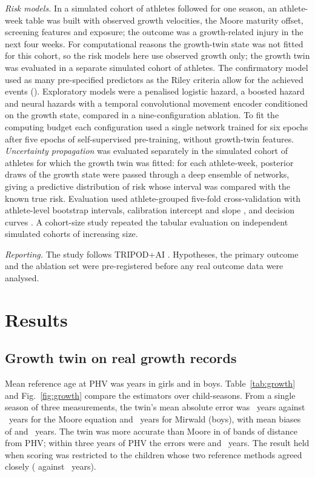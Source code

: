 \documentclass[journal]{IEEEtran}
\begin{document}
\emph{Risk models.} In a simulated cohort of \SimAthletes{} athletes followed for one season,
an athlete-week table was built with observed growth velocities, the Moore maturity offset,
screening features and exposure; the outcome was a growth-related injury in the next four
weeks. For computational reasons the growth-twin state was not fitted for this cohort, so the
risk models here use observed growth only; the growth twin was evaluated in a separate
simulated cohort of \SimGrowthN{} athletes. The confirmatory model used as many pre-specified predictors as the Riley criteria
\cite{riley2020} allow for the achieved events (\SimConfPredictors). Exploratory models were a
penalised logistic hazard, a boosted hazard and neural hazards with a temporal convolutional
movement encoder conditioned on the growth state, compared in a nine-configuration ablation.
To fit the computing budget each configuration used a single network trained for six epochs
after five epochs of self-supervised pre-training, without growth-twin features.
\emph{Uncertainty propagation} was evaluated separately in the simulated cohort of
\SimGrowthN{} athletes for which the growth twin was fitted: for each athlete-week,
\PropDraws{} posterior draws of the growth state were passed through a deep ensemble
\cite{lakshminarayanan2017} of \PropEnsemble{} networks, giving a predictive distribution of
risk whose \SpecInterval{} interval was compared with the known true risk. Evaluation used athlete-grouped five-fold
cross-validation with athlete-level bootstrap intervals, calibration intercept and slope
\cite{vancalster2019}, and decision curves \cite{vickers2006dca}. A cohort-size study repeated
the tabular evaluation on independent simulated cohorts of increasing size.

\emph{Reporting.} The study follows TRIPOD+AI \cite{collins2024tripodai}. Hypotheses, the
primary outcome and the ablation set were pre-registered before any real outcome data were
analysed.

\section{Results}

\subsection{Growth twin on real growth records}
Mean reference age at PHV was \BerkGirlsAPHV{} years in girls and \BerkBoysAPHV{} in boys.
Table~\ref{tab:growth} and Fig.~\ref{fig:growth} compare the estimators over \BerkWindows{}
child-seasons. From a single season of three measurements, the twin's mean absolute error was
\BerkTwinMAE{}~years against \BerkMooreMAE{}~years for the Moore equation and
\BerkMirwaldMAE{}~years for Mirwald (boys), with mean biases of \BerkTwinBias{} and
\BerkMooreBias{}~years. The twin was more accurate than Moore in \BerkBandsBetter{} of
\BerkBands{} bands of distance from PHV; within three years of PHV the errors were
\BerkTwinMAENear{} and \BerkMooreMAENear{}~years. The result held when scoring was restricted
to the \BerkStrict{} children whose two reference methods agreed closely (\BerkStrictTwinMAE{}
against \BerkStrictMooreMAE{}~years).
\end{document}
